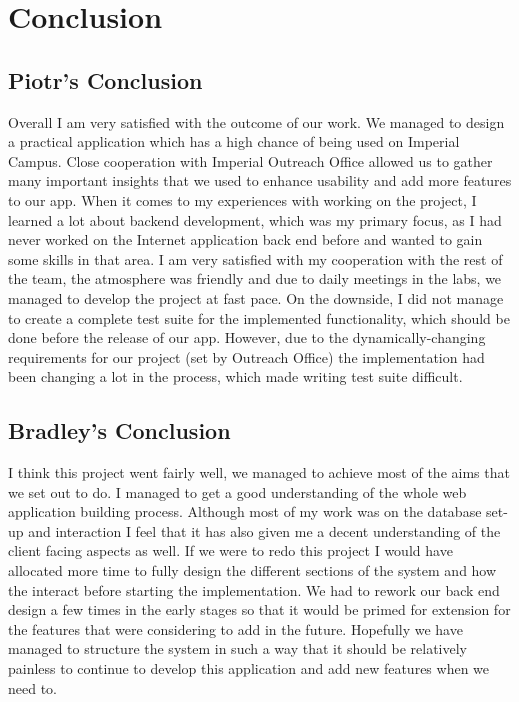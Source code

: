 \documentclass[10pt,a4paper]{article}
\begin{document}
\section{Conclusion}
 \subsection{Piotr's Conclusion}
 Overall I am very satisfied with the outcome of our work. We managed to design a practical application which has a high chance of being used on Imperial Campus. Close cooperation with Imperial Outreach Office allowed us to gather many important insights that we used to enhance usability and add more features to our app. When it comes to my experiences with working on the project, I learned a lot about backend development, which was my primary focus, as I had never worked on the Internet application back end before and wanted to gain some skills in that area. I am very satisfied with my cooperation with the rest of the team, the atmosphere was friendly and due to daily meetings in the labs, we managed to develop the project at fast pace. On the downside, I did not manage to create a complete test suite for the implemented functionality, which should be done before the release of our app. However, due to the dynamically-changing requirements for our project (set by Outreach Office) the implementation had been changing a lot in the process, which made writing test suite difficult. 
 
\subsection{Bradley's Conclusion}
I think this project went fairly well, we managed to achieve most of the aims that we set out to do. I managed to get a good understanding of the whole web application building process. Although most of my work was on the database set-up and interaction I feel that it has also given me a decent understanding of the client facing aspects as well. If we were to redo this project I would have allocated more time to fully design the different sections of the system and how the interact before starting the implementation. We had to rework our back end design a few times in the early stages so that it would be primed for extension for the features that were considering to add in the future. Hopefully we have managed to structure the system in such a way that it should be relatively painless to continue to develop this application and add new features when we need to.  
\end{document}
